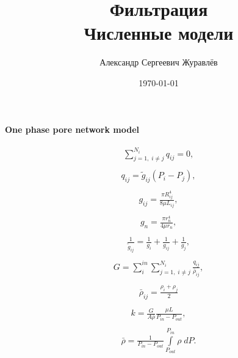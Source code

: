 \documentclass[a4paper,12pt,russian]{extreport}
\author{Александр Сергеевич Журавлёв}
\title{Фильтрация\\Численные модели}
\date{\today}
\begin{document}
\pagecolor{pageColor}
\color{fontColor}
\Russian
\printnomenclature[5em]


\begin{center}
{\large \textbf{One phase pore network model}}
\end{center}

\begin{eqnarray}
\begin{gathered}
\sum^{N_{i}}_{j=1, \; i\neq j} q_{ij} = 0,  
\end{gathered}
\end{eqnarray}
%
\begin{eqnarray}
\begin{gathered}
q_{ij} = \tilde{g}_{ij} (P_{i} - P_{j}),  
\end{gathered}
\end{eqnarray}
%
\begin{eqnarray}
\begin{gathered}
 g_{ij} =\frac{\pi R_{ij}^{4}}{8 \mu L_{ij}}, 
\end{gathered}
\end{eqnarray}
%
\begin{eqnarray}
\begin{gathered}
 g_{n} =\frac{\pi r_{n}^{4}}{4 \mu r_{n}}, 
\end{gathered}
\end{eqnarray}
%
\begin{eqnarray}
\begin{gathered}
 \frac{1}{\tilde{g}_{ij}}  =\frac{1}{g_i}+\frac{1}{g_{ij}}+\frac{1}{g_j}, 
\end{gathered}
\end{eqnarray}
%
\begin{eqnarray}
\begin{gathered}
G = \sum_{i}^{in} \sum^{N_{i}}_{j=1, \; i\neq j} \frac{q_{ij}}{\bar{\rho}_{ij}},
\end{gathered}
\end{eqnarray}
%
\begin{eqnarray}
\begin{gathered}
\bar{\rho}_{ij} = \frac{\rho_{i}+\rho_{j}}{2}
\end{gathered}
\end{eqnarray}
%
\begin{eqnarray}
\begin{gathered}
k = \frac{G}{A \bar{\rho}} \frac{\mu L}{P_{in} - P_{out}},
\end{gathered}
\end{eqnarray}
%
\begin{eqnarray}
\begin{gathered}
 \bar{\rho}=\frac{1}{P_{in}-P_{out}} \int\limits^{P_{in}}_{P_{out}}\rho \; dP.
\end{gathered}
\end{eqnarray}
\end{document}
